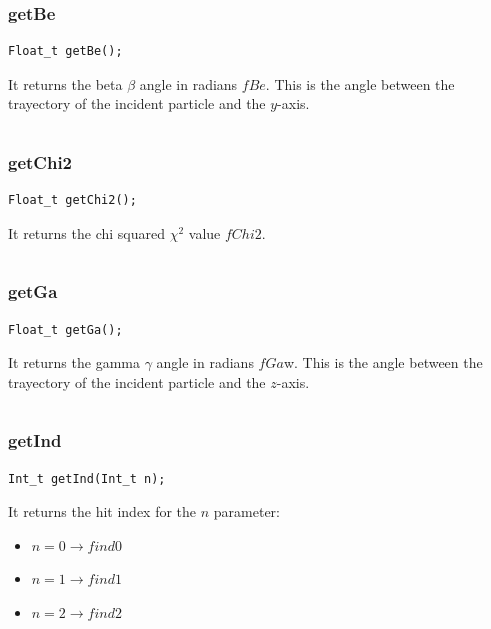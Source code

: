 \documentclass[a4paper]{book}
\begin{document}
\subsubsection{getBe}

\begin{lstlisting}[style=customc]
Float_t getBe();
\end{lstlisting}

It returns the beta $\beta$ angle in radians $fBe$. This is the angle between the trayectory of the incident particle and the $y$-axis.

\[\]

\subsubsection{getChi2}

\begin{lstlisting}[style=customc]
Float_t getChi2();
\end{lstlisting}

It returns the chi squared $\chi^2$ value $fChi2$.

\[\]

\subsubsection{getGa}

\begin{lstlisting}[style=customc]
Float_t getGa();
\end{lstlisting}

It returns the gamma $\gamma$ angle in radians $fGa$w. This is the angle between the trayectory of the incident particle and the $z$-axis.

\[\]

\subsubsection{getInd}

\begin{lstlisting}[style=customc]
Int_t getInd(Int_t n);
\end{lstlisting}

It returns the hit index for the $n$ parameter:
\begin{itemize}
	\item $n = 0 \rightarrow find0$
	\item $n = 1 \rightarrow find1$
	\item $n = 2 \rightarrow find2$
\end{itemize}
\end{document}
